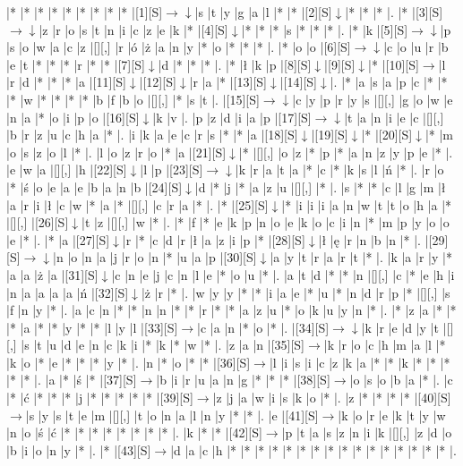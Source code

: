 \documentclass[11pt]{article}
\newcommand\drarr{$\rightarrow \!\!\!\!\! \downarrow$}
\newcommand\rarr{$\rightarrow$}
\newcommand\darr{$\downarrow$}
\begin{document}
\noindent\begin{Puzzle}{21}{30}|*	|*	|*	|*	|*	|*	|*	|*	|*	|[1][S]\drarr	|s	|t	|y	|g	|a	|l	|*	|*	|[2][S]\darr	|*	|*	|*	|.
|*	|[3][S]\drarr	|z	|r	|o	|s	|t	|n	|i	|c	|z	|e	|k	|*	|[4][S]\darr	|*	|*	|*	|s	|*	|*	|*	|.
|*	|k	|[5][S]\drarr	|p	|s	|o	|w	|a	|c	|z	|[][,]{ }	|r	|ó	|ż	|a	|n	|y	|*	|o	|*	|*	|*	|.
|*	|o	|o	|[6][S]\drarr	|c	|o	|u	|r	|b	|e	|t	|*	|*	|*	|r	|*	|*	|[7][S]\darr	|d	|*	|*	|*	|.
|*	|ł	|k	|p	|[8][S]\darr	|[9][S]\darr	|*	|[10][S]\rarr	|l	|r	|d	|*	|*	|*	|a	|[11][S]\darr	|[12][S]\darr	|r	|a	|*	|[13][S]\darr	|[14][S]\darr	|.
|*	|a	|s	|a	|p	|c	|*	|*	|*	|w	|*	|*	|*	|*	|b	|f	|b	|o	|[][,]{ }	|*	|s	|t	|.
|[15][S]\drarr	|c	|y	|p	|r	|y	|s	|[][,]{ }	|g	|o	|w	|e	|n	|a	|*	|o	|i	|p	|o	|[16][S]\darr	|k	|v	|.
|p	|z	|d	|i	|a	|p	|[17][S]\drarr	|t	|a	|n	|i	|e	|c	|[][,]{ }	|b	|r	|z	|u	|c	|h	|a	|*	|.
|i	|k	|a	|e	|c	|r	|s	|*	|*	|a	|[18][S]\darr	|[19][S]\darr	|*	|[20][S]\darr	|*	|m	|o	|s	|z	|o	|l	|*	|.
|l	|o	|z	|r	|o	|*	|a	|[21][S]\darr	|*	|[][,]{ }	|o	|z	|*	|p	|*	|a	|n	|z	|y	|p	|e	|*	|.
|e	|w	|a	|[][,]{ }	|h	|[22][S]\darr	|l	|p	|[23][S]\drarr	|k	|r	|a	|t	|a	|*	|c	|*	|k	|s	|l	|ń	|*	|.
|r	|o	|*	|ś	|o	|e	|a	|e	|b	|a	|n	|b	|[24][S]\darr	|d	|*	|j	|*	|a	|z	|u	|[][,]{ }	|*	|.
|s	|*	|*	|c	|l	|g	|m	|ł	|a	|r	|i	|ł	|c	|w	|*	|a	|*	|[][,]{ }	|c	|r	|a	|*	|.
|*	|[25][S]\darr	|*	|i	|i	|i	|a	|n	|w	|t	|t	|o	|h	|a	|*	|[][,]{ }	|[26][S]\darr	|t	|z	|[][,]{ }	|w	|*	|.
|*	|f	|*	|e	|k	|p	|n	|o	|e	|k	|o	|c	|i	|n	|*	|m	|p	|y	|o	|o	|e	|*	|.
|*	|a	|[27][S]\darr	|r	|*	|c	|d	|r	|ł	|a	|z	|i	|p	|*	|[28][S]\darr	|ł	|ę	|r	|n	|b	|n	|*	|.
|[29][S]\drarr	|n	|o	|n	|a	|j	|r	|o	|n	|*	|u	|a	|p	|[30][S]\darr	|a	|y	|t	|r	|a	|r	|t	|*	|.
|k	|a	|r	|y	|*	|a	|a	|ż	|a	|[31][S]\darr	|c	|n	|e	|j	|c	|n	|l	|e	|*	|o	|u	|*	|.
|a	|t	|d	|*	|*	|n	|[][,]{ }	|c	|*	|e	|h	|i	|n	|a	|a	|a	|a	|ń	|[32][S]\darr	|ż	|r	|*	|.
|w	|y	|y	|*	|*	|i	|a	|e	|*	|u	|*	|n	|d	|r	|p	|*	|[][,]{ }	|s	|f	|n	|y	|*	|.
|a	|c	|n	|*	|*	|n	|n	|*	|*	|r	|*	|*	|a	|z	|u	|*	|o	|k	|u	|y	|n	|*	|.
|*	|z	|a	|*	|*	|*	|a	|*	|*	|y	|*	|*	|l	|y	|l	|[33][S]\rarr	|c	|a	|n	|*	|o	|*	|.
|[34][S]\drarr	|k	|r	|e	|d	|y	|t	|[][,]{ }	|s	|t	|u	|d	|e	|n	|c	|k	|i	|*	|k	|*	|w	|*	|.
|z	|a	|n	|[35][S]\rarr	|k	|r	|o	|c	|h	|m	|a	|l	|*	|k	|o	|*	|e	|*	|*	|*	|y	|*	|.
|n	|*	|o	|*	|*	|[36][S]\rarr	|l	|i	|s	|i	|c	|z	|k	|a	|*	|*	|k	|*	|*	|*	|*	|*	|.
|a	|*	|ś	|*	|[37][S]\rarr	|b	|i	|r	|u	|a	|n	|g	|*	|*	|*	|[38][S]\rarr	|o	|s	|o	|b	|a	|*	|.
|c	|*	|ć	|*	|*	|*	|j	|*	|*	|*	|*	|*	|[39][S]\rarr	|z	|j	|a	|w	|i	|s	|k	|o	|*	|.
|z	|*	|*	|*	|*	|[40][S]\rarr	|s	|y	|s	|t	|e	|m	|[][,]{ }	|t	|o	|n	|a	|l	|n	|y	|*	|*	|.
|e	|[41][S]\rarr	|k	|o	|r	|e	|k	|t	|y	|w	|n	|o	|ś	|ć	|*	|*	|*	|*	|*	|*	|*	|*	|.
|k	|*	|*	|[42][S]\rarr	|p	|t	|a	|s	|z	|n	|i	|k	|[][,]{ }	|z	|d	|o	|b	|i	|o	|n	|y	|*	|.
|*	|[43][S]\rarr	|d	|a	|c	|h	|*	|*	|*	|*	|*	|*	|*	|*	|*	|*	|*	|*	|*	|*	|*	|*	|.\end{Puzzle}
\end{document}
